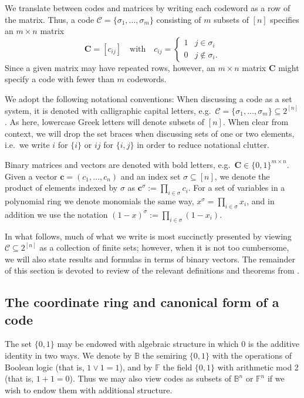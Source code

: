 \documentclass[11pt,letterpaper, reqno]{amsart}
\theoremstyle{definition}
\def\B{\mathbb{B}}
\def\F{\mathbb{F}}
\def\bc{\mathbf{c}}
\def\bC{\mathbf{C}}
\def\cC{\mathcal{C}}
\begin{document}
    We translate between codes and matrices by writing each codeword as a row of the matrix. Thus, a code $\cC = \{\sigma_1,\dots,\sigma_m\}$ consisting of $m$ subsets of $[n]$ specifies an $m \times n$ matrix
    \[ \bC = [c_{ij}] \quad\text{with}\quad c_{ij} = \begin{cases}
        1 & j \in \sigma_i\\
        0 & j \notin \sigma_i.
    \end{cases}\]
    Since a given matrix may have repeated rows, however, an $m \times n$ matrix $\bC$ might specify a code with fewer than $m$ codewords.

    We adopt the following notational conventions: When discussing a code as a set system, it is denoted with calligraphic capital letters, e.g.\ $\cC = \{\sigma_1,\dots,\sigma_m\} \subseteq 2^{[n]}$. As here, lowercase Greek letters will denote subsets of $[n]$. When clear from context, we will drop the set braces when discussing sets of one or two elements, i.e.\ we write $i$ for $\{i\}$ or $ij$ for $\{i,j\}$ in order to reduce notational clutter.
        
    Binary matrices and vectors are denoted with bold letters, e.g.\ $\bC \in \{0,1\}^{m\times n}$.
    Given a vector $\bc = (c_1,\dots,c_n)$ and an index set $\sigma \subseteq [n]$, we denote the product of elements indexed by $\sigma$ as $\bc^\sigma := \prod_{i\in\sigma} c_i$. For a set of variables in a polynomial ring we denote monomials the same way, $x^\sigma = \prod_{i\in\sigma} x_i$, and in addition we use the notation $(1 - x)^\sigma := \prod_{i\in\sigma} (1- x_i)$.

    In what follows, much of what we write is most succinctly presented by viewing $\cC \subseteq2^{[n]}$ as a collection of finite sets; however, when it is not too cumbersome, we will also state results and formulas in terms of binary vectors. The remainder of this section is devoted to review of the relevant definitions and theorems from \cites{neuralring13, morphisms, jeffs2019sunflowers}.

    \subsection{The coordinate ring and canonical form of a code}
    The set $\{0,1\}$ may be endowed with algebraic structure in which $0$ is the additive identity in two ways. We denote by $\B$ the semiring $\{0,1\}$ with the operations of Boolean logic (that is, $1 \vee 1 = 1$),
    and by $\F$ the field $\{0,1\}$ with arithmetic mod 2 (that is, $1 + 1 = 0$). Thus we may also view codes as subsets of $\B^n$ or $\F^n$ if we wish to endow them with additional structure.
        
\end{document}
